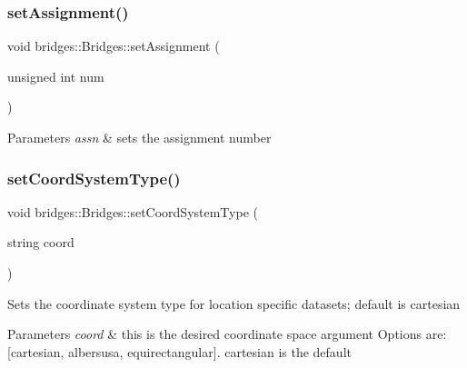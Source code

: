 \subsubsection{\texorpdfstring{set\+Assignment()}{setAssignment()}}
{\footnotesize\ttfamily void bridges\+::\+Bridges\+::set\+Assignment (\begin{DoxyParamCaption}\item[{unsigned int}]{num }\end{DoxyParamCaption})}


\begin{DoxyParams}{Parameters}
{\em assn} & sets the assignment number \\
\hline
\end{DoxyParams}
\mbox{\label{namespacebridges_1_1_bridges_ad00c07d3a028110424909081a94c4013}} 
\subsubsection{\texorpdfstring{set\+Coord\+System\+Type()}{setCoordSystemType()}}
{\footnotesize\ttfamily void bridges\+::\+Bridges\+::set\+Coord\+System\+Type (\begin{DoxyParamCaption}\item[{string}]{coord }\end{DoxyParamCaption})}

Sets the coordinate system type for location specific datasets; default is cartesian


\begin{DoxyParams}{Parameters}
{\em coord} & this is the desired coordinate space argument Options are\+: \mbox{[}\textquotesingle{}cartesian\textquotesingle{}, \textquotesingle{}albersusa\textquotesingle{}, \textquotesingle{}equirectangular\textquotesingle{}\mbox{]}. \textquotesingle{}cartesian\textquotesingle{} is the default \\
\hline
\end{DoxyParams}
\mbox{\label{namespacebridges_1_1_bridges_a7447e2d5808c492d26132690c1a639a7}} 
